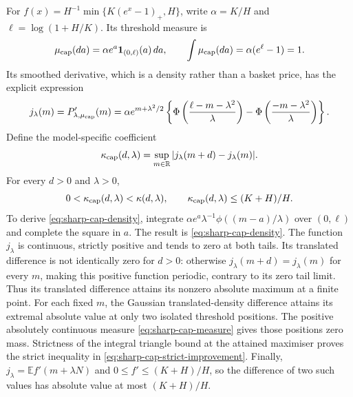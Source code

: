 \documentclass[11pt]{article}
\begin{document}
For $f(x)=H^{-1}\min\{K(e^x-1)_+,H\}$, write
$\alpha=K/H$ and $\ell=\log(1+H/K)$. Its threshold measure is
\begin{equation}
 \mu_{\rm cap}(da)=\alpha e^a\mathbf1_{(0,\ell)}(a)\,da,
 \qquad\int\mu_{\rm cap}(da)=\alpha(e^\ell-1)=1.
 \label{eq:sharp-cap-measure}
\end{equation}
Its smoothed derivative, which is a density rather than a basket price,
has the explicit expression
\begin{equation}
 j_\lambda(m)=P_{\lambda,\mu_{\rm cap}}'(m)
 =\alpha e^{m+\lambda^2/2}
 \left\{\Phi\left(\frac{\ell-m-\lambda^2}{\lambda}\right)
              -\Phi\left(\frac{-m-\lambda^2}{\lambda}\right)\right\}.
 \label{eq:sharp-cap-density}
\end{equation}
Define the model-specific coefficient
\begin{equation}
 \kappa_{\rm cap}(d,\lambda)
  =\sup_{m\in\mathbb R}|j_\lambda(m+d)-j_\lambda(m)|.
 \label{eq:sharp-cap-kappa}
\end{equation}
For every $d>0$ and $\lambda>0$,
\begin{equation}
 0<\kappa_{\rm cap}(d,\lambda)
   <\kappa(d,\lambda),\qquad
 \kappa_{\rm cap}(d,\lambda)\leq(K+H)/H.
 \label{eq:sharp-cap-strict-improvement}
\end{equation}
To derive \eqref{eq:sharp-cap-density}, integrate
$\alpha e^a\lambda^{-1}\phi((m-a)/\lambda)$ over $(0,\ell)$
and complete the square in $a$. The result is
\eqref{eq:sharp-cap-density}. The function $j_\lambda$ is continuous,
strictly positive and tends to zero at both tails. Its translated
difference is not identically zero for $d>0$: otherwise
$j_\lambda(m+d)=j_\lambda(m)$ for every $m$, making this positive
function periodic, contrary to its zero tail limit. Thus its translated
difference attains its nonzero absolute maximum at a finite point.
For each fixed $m$, the Gaussian translated-density difference attains
its extremal absolute value at only two isolated threshold positions.
The positive absolutely continuous measure \eqref{eq:sharp-cap-measure}
gives those positions zero mass. Strictness of the integral triangle
bound at the attained maximiser proves the strict inequality in
\eqref{eq:sharp-cap-strict-improvement}. Finally,
$j_\lambda=\mathbb E f'(m+\lambda N)$ and
$0\leq f'\leq(K+H)/H$, so the difference of two such values has
absolute value at most $(K+H)/H$.
\end{document}
